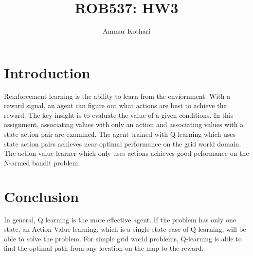\documentclass[a4paper]{article}
\title{ROB537: HW3}
\author{Ammar Kothari}
\date{}
\begin{document}
\maketitle


\section{Introduction}
Reinforcement learning is the ability to learn from the enviornment.  With a reward signal, an agent can figure out what actions are best to achieve the reward.  The key insight is to evaluate the value of a given conditions.  In this assignment, associating values with only an action and associating values with a state action pair are examined.  The agent trained with Q-learning which uses state action pairs achieves near optimal performance on the grid world domain.  The action value learner which only uses actions achieves good peformance on the N-armed bandit problem. 





\section{Conclusion}
In general, Q learning is the more effective agent.  If the problem has only one state, an Action Value learning, which is a single state case of Q learning, will be able to solve the problem.  For simple grid world problems, Q-learning is able to find the optimal path from any location on the map to the reward.
\end{document}
